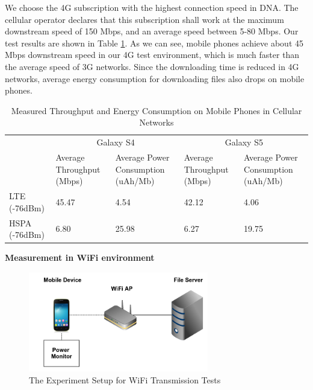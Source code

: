 \documentclass[english]{tktltiki}
\begin{document}
We choose the 4G subscription with the highest connection speed in DNA. The cellular operator declares that this subscription shall work at the maximum downstream speed of 150 Mbps, and an average speed between 5-80 Mbps. Our test results are shown in Table \ref{tab:cellular-speed}. As we can see, mobile phones achieve about 45 Mbps downstream speed in our 4G test environment, which is much faster than the average speed of 3G networks. Since the downloading time is reduced in 4G networks, average energy consumption for downloading files also drops on mobile phones. 

\begin{table}[htbp]
\centering
\begin{tabular}{|p{90pt}|p{60pt}|p{75pt}|p{60pt}|p{75pt}|}
  \hline
  & \multicolumn{2}{c|}{Galaxy S4} & \multicolumn{2}{c|}{Galaxy S5}\\
  \cline{2-5}
  & Average Throughput (Mbps) & Average Power Consumption (uAh/Mb) & Average Throughput (Mbps) & Average Power Consumption (uAh/Mb) \\
  \hline
  LTE (-76dBm\footnotemark[7]) & 45.47 & 4.54 & 42.12 & 4.06 \\
  \hline
  HSPA (-76dBm\footnotemark[7]) & 6.80 & 25.98 & 6.27 & 19.75 \\
  \hline
\end{tabular}
\caption{Measured Throughput and Energy Consumption on Mobile Phones in Cellular Networks}
\label{tab:cellular-speed}
\end{table}




\vspace{1mm}

\textbf{Measurement in WiFi environment}

\vspace{1mm}

\begin{figure}[htbp]
  \centering
  \includegraphics[width=0.7\textwidth]{images/wifi-test.png}
  \caption{The Experiment Setup for WiFi Transmission Tests}
  \label{fig:wifi-test}
\end{figure}
\end{document}
